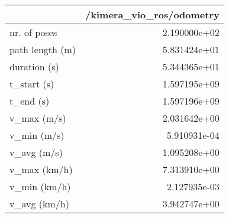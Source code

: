 \begin{tabular}{lr}
\toprule
{} &  /kimera\_vio\_ros/odometry \\
\midrule
nr. of poses    &              2.190000e+02 \\
path length (m) &              5.831424e+01 \\
duration (s)    &              5.344365e+01 \\
t\_start (s)     &              1.597195e+09 \\
t\_end (s)       &              1.597196e+09 \\
v\_max (m/s)     &              2.031642e+00 \\
v\_min (m/s)     &              5.910931e-04 \\
v\_avg (m/s)     &              1.095208e+00 \\
v\_max (km/h)    &              7.313910e+00 \\
v\_min (km/h)    &              2.127935e-03 \\
v\_avg (km/h)    &              3.942747e+00 \\
\bottomrule
\end{tabular}
